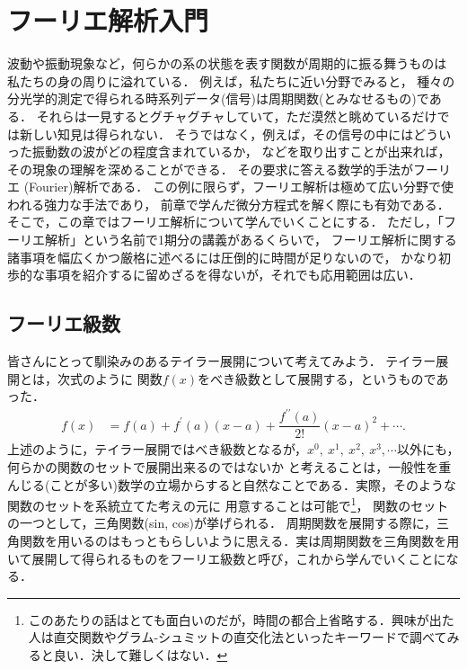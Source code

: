 \setcounter{chapter}{1}
\chapter{フーリエ解析入門}
%
波動や振動現象など，何らかの系の状態を表す関数が周期的に振る舞うものは
私たちの身の周りに溢れている．
例えば，私たちに近い分野でみると，
種々の分光学的測定で得られる時系列データ(信号)は周期関数(とみなせるもの)である．
それらは一見するとグチャグチャしていて，ただ漠然と眺めているだけでは新しい知見は得られない．
そうではなく，例えば，その信号の中にはどういった振動数の波がどの程度含まれているか，
などを取り出すことが出来れば，その現象の理解を深めることができる．
その要求に答える数学的手法がフーリエ (Fourier)解析である．
この例に限らず，フーリエ解析は極めて広い分野で使われる強力な手法であり，
前章で学んだ微分方程式を解く際にも有効である．
そこで，この章ではフーリエ解析について学んでいくことにする．
ただし，「フーリエ解析」という名前で1期分の講義があるくらいで，
フーリエ解析に関する諸事項を幅広くかつ厳格に述べるには圧倒的に時間が足りないので，
かなり初歩的な事項を紹介するに留めざるを得ないが，それでも応用範囲は広い．

%
\section{フーリエ級数}
%
皆さんにとって馴染みのあるテイラー展開について考えてみよう．
テイラー展開とは，次式のように
関数$f(x)$をべき級数として展開する，というものであった．
\begin{align}
  f\left(x\right) &= f\left(a\right) + f^{\prime}\left(a\right)
 \left(x-a\right) + \dfrac{f^{\prime\prime}\left(a\right)}{2!}\left(x-a\right)^{2} + \cdots. 
\end{align}
%
上述のように，テイラー展開ではべき級数となるが，$x^{0},~x^{1},~x^2,~x^3,\cdots$以外にも，何らかの関数のセットで展開出来るのではないか
と考えることは，一般性を重んじる(ことが多い)数学の立場からすると自然なことである．実際，そのような関数のセットを系統立てた考えの元に
用意することは可能で\footnote{このあたりの話はとても面白いのだが，時間の都合上省略する．興味が出た人は直交関数やグラム-シュミットの直交化法といったキーワードで調べてみると良い．決して難しくはない．}，
関数のセットの一つとして，三角関数(sin, cos)が挙げられる．
周期関数を展開する際に，三角関数を用いるのはもっともらしいように思える．実は周期関数を三角関数を用いて展開して得られるものをフーリエ級数と呼び，これから学んでいくことになる．

